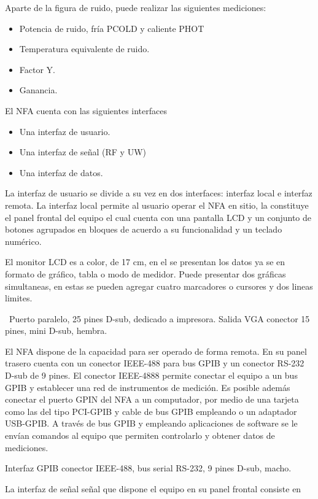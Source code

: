 \documentclass[paper=letter,oneside,fontsize=10pt,parskip=full]{article}
\begin{document}
Aparte de la figura de ruido, puede realizar las siguientes mediciones:

\begin{itemize}
\item Potencia de ruido, fría PCOLD y caliente PHOT
\item Temperatura equivalente de ruido.
\item Factor Y.
\item Ganancia.
\end{itemize}
El NFA cuenta con las siguientes interfaces

\begin{itemize}
\item Una interfaz de usuario. 
\item Una interfaz de señal (RF y UW)
\item Una interfaz de datos.
\end{itemize}
La interfaz de usuario se divide a su vez en dos interfaces: interfaz local e interfaz remota. La interfaz local permite
al usuario operar el NFA en sitio, la constituye el panel frontal del equipo el cual cuenta con una pantalla LCD y un
conjunto de botones agrupados en bloques de acuerdo a su funcionalidad y un teclado numérico.

El monitor LCD es a color, de 17 cm, en el se presentan los datos ya se en formato de gráfico, tabla o modo de medidor.
Puede presentar dos gráficas simultaneas, en estas se pueden agregar cuatro marcadores o cursores y dos lineas limites.

\ Puerto paralelo, 25 pines D-sub, dedicado a impresora. Salida VGA conector 15 pines, mini D-sub, hembra.

El NFA dispone de la capacidad para ser operado de forma remota. En su panel trasero cuenta con un conector IEEE-488
para bus GPIB y un conector RS-232 D-sub de 9 pines. El conector IEEE-4888 permite conectar el equipo a un bus GPIB y
establecer una red de instrumentos de medición. Es posible además conectar el puerto GPIN del NFA a un computador, por
medio de una tarjeta como las del tipo PCI-GPIB y cable de bus GPIB empleando o un adaptador USB-GPIB. A través de bus
GPIB y empleando aplicaciones de software se le envían comandos al equipo que permiten controlarlo y obtener datos de
mediciones.

Interfaz GPIB conector IEEE-488, bus serial RS-232, 9 pines D-sub, macho.

La interfaz de señal señal que dispone el equipo en su panel frontal consiste en 
\end{document}
